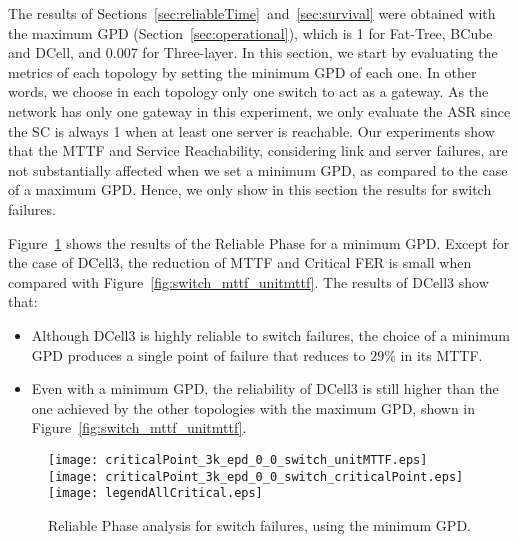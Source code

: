The results of Sections~\ref{sec:reliableTime}~and~\ref{sec:survival} were obtained with the maximum GPD (Section~\ref{sec:operational}), which is 1 for Fat-Tree, BCube and DCell, and 0.007 for Three-layer. In this section, we start by evaluating the metrics of each topology by setting the minimum GPD of each one. In other words, we choose in each topology only one switch to act as a gateway. As the network has only one gateway in this experiment, we only evaluate the ASR since the SC is always 1 when at least one server is reachable. Our experiments show that the MTTF and Service Reachability, considering link and server failures, are not substantially affected when we set a minimum GPD, as compared to the case of a maximum GPD. Hence, we only show in this section the results for switch failures.

Figure~\ref{fig:switch_min_epd_mttf_unitmttf} shows the results of the Reliable Phase for a minimum GPD.
Except for the case of DCell3, the reduction of MTTF and Critical FER is small when compared with Figure~\ref{fig:switch_mttf_unitmttf}. The results of DCell3 show that:
\begin{itemize}
\item Although DCell3 is highly reliable to switch failures, the choice of a minimum GPD produces a single point of failure that reduces to $29\%$ in its MTTF.
\item Even with a minimum GPD, the reliability of DCell3 is still higher than the one achieved by the other topologies with the maximum GPD, shown in Figure~\ref{fig:switch_mttf_unitmttf}.
\end{itemize}
\begin{figure}
\centering
\texttt{[image: criticalPoint\_3k\_epd\_0\_0\_switch\_unitMTTF.eps]} \quad
\texttt{[image: criticalPoint\_3k\_epd\_0\_0\_switch\_criticalPoint.eps]}
\texttt{[image: legendAllCritical.eps]}
\caption{Reliable Phase analysis for switch failures, using the minimum GPD.}
\label{fig:switch_min_epd_mttf_unitmttf}
\end{figure}

